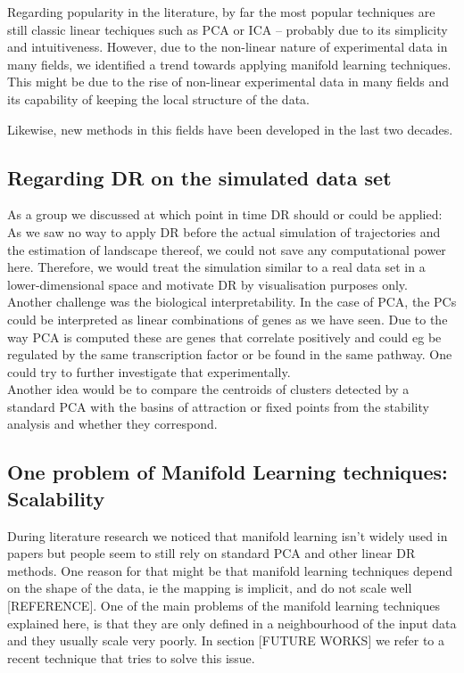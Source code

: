 \documentclass[journal, a4paper]{IEEEtran}
\begin{document}
Regarding popularity in the literature, %
by far the most popular techniques are still classic linear techiques such as PCA or ICA -- probably due to its simplicity and intuitiveness. However, due to the non-linear nature of experimental data in many fields, we identified a trend towards applying manifold learning techniques. This might be due to the rise of non-linear experimental data in many fields and its capability of keeping the local structure of the data.

Likewise, new methods in this fields have been developed in the last two decades.



\subsection{Regarding DR on the simulated data set}

As a group we discussed at which point in time DR should or could be applied: As we saw no way to apply DR before the actual simulation of trajectories and the estimation of landscape thereof, we could not save any computational power here. Therefore, we would treat the simulation similar to a real data set in a lower-dimensional space and motivate DR by visualisation purposes only.\\

Another challenge was the biological interpretability. In the case of PCA, the PCs could be interpreted as linear combinations of genes as we have seen. Due to the way PCA is computed these are genes that correlate positively and could eg be regulated by the same transcription factor or be found in the same pathway. 
One could try to further investigate that experimentally. \\
Another idea would be to compare the centroids of clusters detected by a standard PCA with the basins of attraction or fixed points from the stability analysis and whether they correspond.

\subsection{One problem of Manifold Learning techniques: Scalability}
During literature research we noticed that manifold learning isn’t widely used in papers but people seem to still rely on standard PCA and other linear DR methods. 
One reason for that might be that manifold learning techniques depend on the shape of the data, ie the mapping is implicit, and do not scale well [REFERENCE]. 
One of the main problems of the manifold learning techniques explained here, is that they are only defined in a neighbourhood of the input data and they usually scale very poorly. In section [FUTURE WORKS] we refer to a recent technique that tries to solve this issue.
\end{document}
